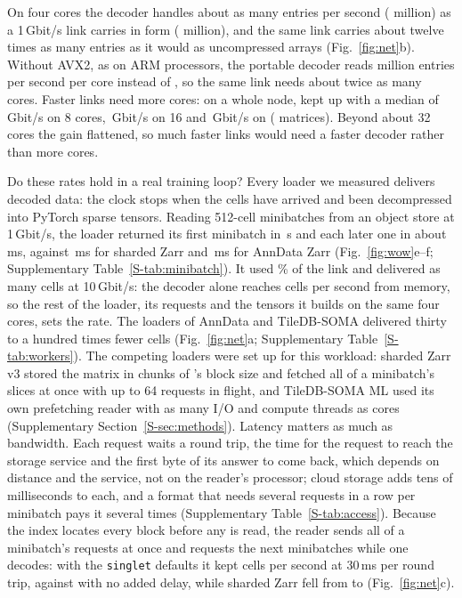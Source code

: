 

On four cores the \sone{} decoder handles about as many entries per second ( million) as a 1\,Gbit/s
link carries in \sone{} form ( million), and the same link carries about twelve times as many entries as
it would as uncompressed arrays (Fig.~\ref{fig:net}b). Without AVX2, as on ARM processors, the portable decoder reads
 million entries per second per core instead of , so the same
link needs about twice as many cores. Faster links need more cores: on a
whole node, \sone{} kept up with a median of \,Gbit/s on 8 cores, \,Gbit/s on 16 and
\,Gbit/s on  ( matrices). Beyond about 32 cores the gain flattened, so much faster
links would need a faster decoder rather than more cores.

Do these rates hold in a real training loop? Every loader we measured delivers decoded data: the clock stops when the
cells have arrived and been decompressed into PyTorch sparse tensors. Reading 512-cell minibatches from an object store
at 1\,Gbit/s, the \sone{} loader returned its first minibatch in \,s and each later one in about
\,ms, against \,ms for sharded Zarr and
\,ms for AnnData Zarr (Fig.~\ref{fig:wow}e--f; Supplementary
Table~\ref{S-tab:minibatch}). It used \% of the link and delivered as many cells at 10\,Gbit/s: the
decoder alone reaches  cells per second from memory, so the rest of the loader, its requests and
the tensors it builds on the same four cores, sets the rate. The loaders of AnnData and TileDB-SOMA delivered thirty to a
hundred times fewer cells (Fig.~\ref{fig:net}a; Supplementary Table~\ref{S-tab:workers}). The competing loaders were set
up for this workload: sharded Zarr v3 stored the matrix in chunks of \sone's block size and fetched all of a minibatch's
slices at once with up to 64 requests in flight, and TileDB-SOMA ML used its own prefetching reader with as many I/O and
compute threads as cores (Supplementary Section~\ref{S-sec:methods}). Latency matters as much as bandwidth. Each request waits a round trip, the time for the request
to reach the storage service and the first byte of its answer to come back, which depends on distance and the service,
not on the reader's processor; cloud storage adds tens of milliseconds to each, and a format that needs several
requests in a row per minibatch pays it several times (Supplementary Table~\ref{S-tab:access}). Because the
index locates every block before any is read, the \sone{} reader sends all of a minibatch's requests at once and requests
the next minibatches while one decodes: with the \texttt{singlet} defaults it kept  cells per
second at 30\,ms per round trip, against  with no added delay, while sharded Zarr fell from
 to  (Fig.~\ref{fig:net}c).


